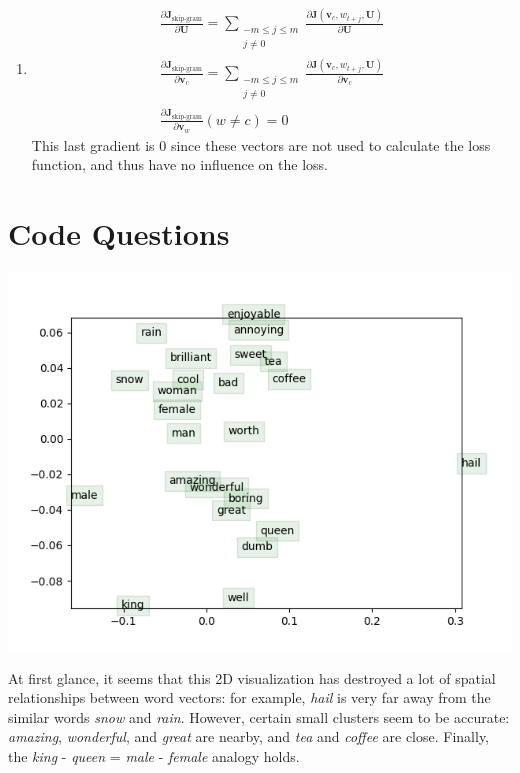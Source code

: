 \documentclass{article}
\begin{document}
\begin{enumerate}[label=(\alph*)]
    \item 
    \begin{gather*}
        \frac{\partial \boldsymbol{J}_\text{skip-gram}}{\partial \boldsymbol{U}}
        = \sum_{\substack{-m \leq j \leq m \\ j \neq 0}}
        \frac{\partial \boldsymbol{J}(\mathbf{v}_c, w_{t+j}, \boldsymbol{U})}{\partial \boldsymbol{U}}
        \\
        \frac{\partial \boldsymbol{J}_\text{skip-gram}}{\partial \mathbf{v}_c}
        = \sum_{\substack{-m \leq j \leq m \\ j \neq 0}}
        \frac{\partial \boldsymbol{J}(\mathbf{v}_c, w_{t+j}, \boldsymbol{U})}{\partial \boldsymbol{v}_c}
        \\
        \frac{\partial \boldsymbol{J}_\text{skip-gram}}{\partial \mathbf{v}_w} (w \neq c) = 0
    \end{gather*}
    This last gradient is $0$ since these vectors are not used to calculate the loss function, and thus have no influence on the loss.
\end{enumerate}

\section*{Code Questions}

\includegraphics{word_vectors.png}

At first glance, it seems that this 2D visualization has destroyed a lot of spatial relationships between word vectors: for example, \emph{hail} is very far away from the similar words \emph{snow} and \emph{rain}. However, certain small clusters seem to be accurate: \emph{amazing}, \emph{wonderful}, and \emph{great} are nearby, and \emph{tea} and \emph{coffee} are close. Finally, the \emph{king} - \emph{queen} = \emph{male} - \emph{female} analogy holds.

    
\end{document}
